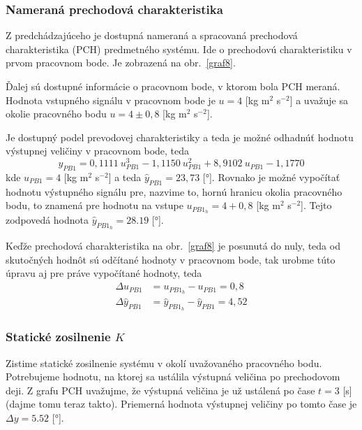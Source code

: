 \documentclass[a4paper, 10pt, ]{article}
\begin{document}
\subsubsection{Nameraná prechodová charakteristika}

Z predchádzajúceho je dostupná nameraná a spracovaná prechodová charakteristika (PCH) predmetného systému. Ide o prechodovú charakteristiku v prvom pracovnom bode. Je zobrazená na obr.~\ref{graf8}.



Ďalej sú dostupné informácie o pracovnom bode, v ktorom bola PCH meraná. Hodnota vstupného signálu v pracovnom bode je $u = 4$ [kg m$^2$ s$^{-2}$] a uvažuje sa okolie pracovného bodu $u = 4 \pm 0,8$ [kg m$^2$ s$^{-2}$].

Je dostupný podel prevodovej charakteristiky a teda je možné odhadnúť hodnotu výstupnej veličiny v pracovnom bode, teda
\begin{equation}
    \hat y_{PB1} = 0,1111\ u_{PB1}^3  -1,1150\ u_{PB1}^2 + 8,9102\ u_{PB1}  -1,1770
\end{equation}
kde $u_{PB1} = 4$ [kg m$^2$ s$^{-2}$] a teda $\hat y_{PB1} = 23,73$ [°]. Rovnako je možné vypočítať hodnotu výstupného signálu pre, nazvime to, hornú hranicu okolia pracovného bodu, to znamená pre hodnotu na vstupe $u_{PB1_h} = 4 + 0,8$ [kg m$^2$ s$^{-2}$]. Tejto zodpovedá hodnota $\hat y_{PB1_h} = 28.19$ [°].

Keďže prechodová charakteristika na obr.~\ref{graf8} je posunutá do nuly, teda od skutočných hodnôt sú odčítané hodnoty v pracovnom bode, tak urobme túto úpravu aj pre práve vypočítané hodnoty, teda
\begin{align}
    \Delta u_{PB1} &= u_{PB1_h} - u_{PB1} = 0,8 \\
    \Delta \hat y_{PB1} &= \hat y_{PB1_h} -  \hat y_{PB1} = 4,52
\end{align}




\subsubsection{Statické zosilnenie $K$}

Zistime statické zosilnenie systému v okolí uvažovaného pracovného bodu. Potrebujeme hodnotu, na ktorej sa ustálila výstupná veličina po prechodovom deji. Z grafu PCH uvažujme, že výstupná veličina je už ustálená po čase $t=3$ [s] (dajme tomu teraz takto). Priemerná hodnota výstupnej veličiny po tomto čase je $\Delta y = 5.52$ [°].
\end{document}
